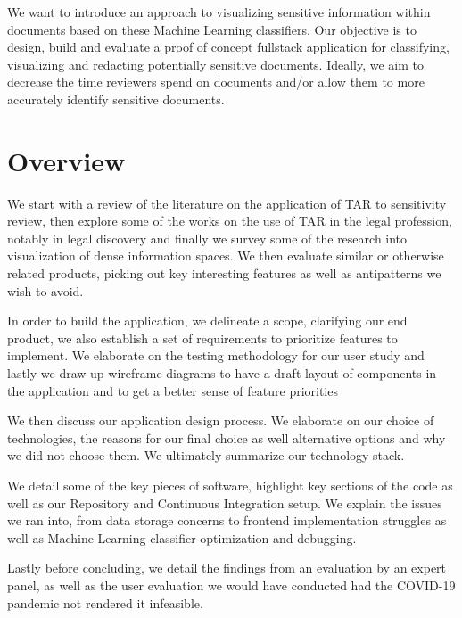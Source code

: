 \documentclass{l4proj}
\begin{document}
We want to introduce an approach to visualizing sensitive information within documents based on these Machine Learning classifiers.
Our objective is to design, build and evaluate a proof of concept fullstack application for classifying, visualizing and redacting potentially sensitive documents.
Ideally, we aim to decrease the time reviewers spend on documents and/or allow them to more accurately identify sensitive documents.

\section{Overview}

We start with a review of the literature on the application of TAR to sensitivity review, then explore some of the works on the use of TAR in the legal profession, notably in legal discovery and finally we survey some of the research into visualization of dense information spaces.
We then evaluate similar or otherwise related products, picking out key interesting features as well as antipatterns we wish to avoid.

In order to build the application, we delineate a scope, clarifying our end product, we also establish a set of requirements to prioritize features to implement.
We elaborate on the testing methodology for our user study and lastly we draw up wireframe diagrams to have a draft layout of components in the application and to get a better sense of feature priorities

We then discuss our application design process. We elaborate on our choice of technologies, the reasons for our final choice as well alternative options and why we did not choose them. We ultimately summarize our technology stack.

We detail some of the key pieces of software, highlight key sections of the code as well as our Repository and Continuous Integration setup.
We explain the issues we ran into, from data storage concerns to frontend implementation struggles as well as Machine Learning classifier optimization and debugging.

Lastly before concluding, we detail the findings from an evaluation by an expert panel, as well as the user evaluation we would have conducted had the COVID-19 pandemic not rendered it infeasible.


\end{document}
